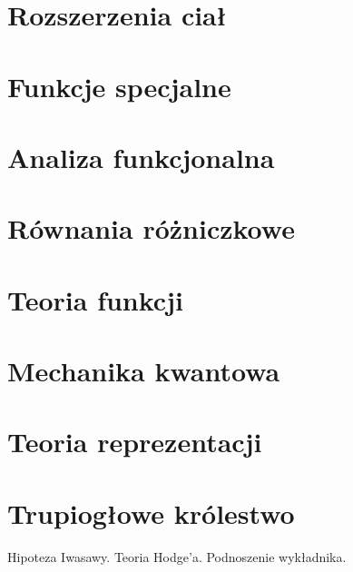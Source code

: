 \chapter{Rozszerzenia ciał}
  
  
  
  
  
  
  
  
  

\chapter{Funkcje specjalne\label{parum}}
  
  
  

  

  
  

  
  
  

   
   
   
   
   
   

\chapter{Analiza funkcjonalna}


\chapter{Równania różniczkowe}
  

\chapter{Teoria funkcji}


\chapter{Mechanika kwantowa}
  

\chapter{Teoria reprezentacji}


\chapter{Trupiogłowe królestwo}
Hipoteza Iwasawy.
Teoria Hodge'a.
Podnoszenie wykładnika.

